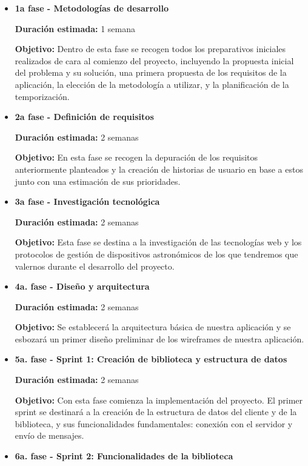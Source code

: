 \begin{itemize}
	\item \textbf{1a fase - Metodologías de desarrollo}
	
	\textbf{Duración estimada:} 1 semana
	
	\textbf{Objetivo:} Dentro de esta fase se recogen todos los preparativos iniciales realizados de cara al comienzo del proyecto, incluyendo la propuesta inicial del problema y su solución, una primera propuesta de los requisitos de la aplicación, la elección de la metodología a utilizar, y la planificación de la temporización.
	
	
	\item \textbf{2a fase - Definición de requisitos}
	
	\textbf{Duración estimada:} 2 semanas
	
	\textbf{Objetivo:} En esta fase se recogen la depuración de los requisitos anteriormente planteados y la creación de historias de usuario en base a estos junto con una estimación de sus prioridades. 
	
	
	\item \textbf{3a fase - Investigación tecnológica}
	
	\textbf{Duración estimada:} 2 semanas
	
	\textbf{Objetivo:} Esta fase se destina a la investigación de las tecnologías web y los protocolos de gestión de dispositivos astronómicos de los que tendremos que valernos durante el desarrollo del proyecto. 
	
	
	\item \textbf{4a. fase - Diseño y arquitectura}
	
	\textbf{Duración estimada:} 2 semanas
	
	\textbf{Objetivo:} Se establecerá la arquitectura básica de nuestra aplicación y se esbozará un primer diseño preliminar de los wireframes de nuestra aplicación.
	
	
	\item \textbf{5a. fase - Sprint 1: Creación de biblioteca y estructura de datos}
	
	\textbf{Duración estimada:} 2 semanas
	
	\textbf{Objetivo:} Con esta fase comienza la implementación del proyecto. El primer sprint se destinará a la creación de la estructura de datos del cliente y de la biblioteca, y sus funcionalidades fundamentales: conexión con el servidor y envío de mensajes.
	 
	
	\item \textbf{6a. fase - Sprint 2: Funcionalidades de la biblioteca}
	

\end{itemize}
